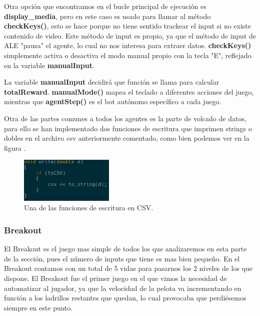 Otra opción que encontramos en el bucle principal de ejecución es \textbf{display\_media}, pero en este caso es usado para llamar al método \textbf{checkKeys()}, esto se hace porque no tiene sentido trackear el input si no existe contenido de video. Este método de input es propio, ya que el método de input de ALE "pausa" el agente, lo cual no nos interesa para extraer datos. \textbf{checkKeys()} simplemente activa o desactiva el modo manual propio con la tecla "E", reflejado en la variable \textbf{manualInput}.

La variable \textbf{manualInput} decidirá que función se llama para calcular \textbf{totalReward}. \textbf{manualMode()} mapea el teclado a diferentes acciones del juego, mientras que \textbf{agentStep()} es el bot autónomo específico a cada juego.

Otra de las partes comunes a todos los agentes es la parte de volcado de datos, para ello se han implementado dos funciones de escritura que imprimen strings o dobles en el archivo \ac{csv} anteriormente comentado, como bien podemos ver en la figura .

\begin{figure}[h]
	\centering
	\includegraphics[width=0.4\textwidth]{Figures/aledumpcsv}
	\caption{Una de las funciones de escritura en CSV.}
	\label{fig:aledumpcsv}
\end{figure}


\subsubsection{Breakout}
\label{subsec:botsbasicos:breakout}
El Breakout es el juego mas simple de todos los que analizaremos en esta parte de la sección, pues el número de inputs que tiene es mas bien pequeño. En el Breakout contamos con un total de 5 vidas para pasarnos los 2 niveles de los que dispone. El Breakout fue el primer juego en el que vimos la necesidad de automatizar al jugador, ya que la velocidad de la pelota va incrementando en función a los ladrillos restantes que quedan, lo cual provocaba que perdiésemos siempre en este punto.

